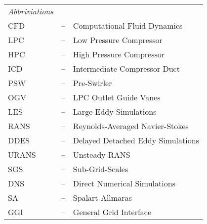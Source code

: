 
\begin{tabular}{ l c l }
%
%
%
%  
  \vspace{0.2cm}
  \textit{Abbriviations} & &\\
  CFD & -- & Computational Fluid Dynamics\\
  LPC & -- & Low Pressure Compressor\\
  HPC & -- & High Pressure Compressor\\
  ICD & -- & Intermediate Compressor Duct\\
  PSW & -- & Pre-Swirler\\
  OGV & -- & LPC Outlet Guide Vanes\\
  LES & -- & Large Eddy Simulations\\
  RANS& -- & Reynolds-Averaged Navier-Stokes\\
  DDES& -- & Delayed Detached Eddy Simulations\\
  URANS& -- & Unsteady RANS\\
  SGS & -- & Sub-Grid-Scales\\
  DNS & -- & Direct Numerical Simulations\\
  SA  & -- & Spalart-Allmaras\\
  GGI & -- & General Grid Interface\\

\end{tabular}
